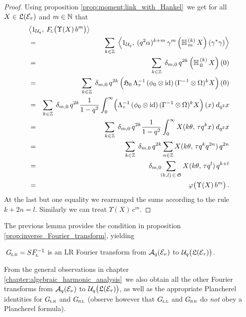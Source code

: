 \begin{proof}
Using proposition \ref{prop:moment:link_with_Hankel}\ we get for
all $X\in \mathfrak{L}(\mathcal E_\tau)$ and $m\in \mathbb{N}$ that
\begin{eqnarray*}
    \lefteqn{ \left\langle 1_{\Uq} ,\: \FLabb
              \!\left(\vertM\Upsilon(X)\, b^m\right)\right\rangle}
\\&=&
    \sum_{k\in\ZZ} \;  \left\langle 1_{\Uq} ,\: (q^2 \alpha)^{k+m}\, \gamma^m
               \left(\YaH{m}{k}\,X\right)(\gamma^*\gamma) \right\rangle
\\&=&
     \sum_{k\in\ZZ} \; \delta_{m,0} \, q^{2k} \left(\YaH{0}{k}\,X\right)(0)
\\&=&
     \sum_{k\in\ZZ} \; \delta_{m,0} \, q^{2k} \left(\holH{0} \, \Lambda_\tau^{-1}\,
         (\evzero \tens \id)\,(\Gamma^{-1} \tens \Omega)^k X \vertL\right)(0)
\\&=&
     \sum_{k\in\ZZ} \; \delta_{m,0} \, q^{2k}  \frac{1}{1-q^2} \int_0^\infty
     \! \left(\Lambda_\tau^{-1}\, (\evzero \tens \id)\,
           (\Gamma^{-1} \tens \Omega)^k X \vertL\right)(x) \: d_{q^2}x
\\&=&
     \sum_{k\in\ZZ} \; \delta_{m,0} \, q^{2k}  \frac{1}{1-q^2} \int_0^\infty
        X(k\theta,\, \tau q^k x) \: d_{q^2}x
\\&=&
     \sum_{k\in\ZZ} \; \delta_{m,0} \, q^{2k}
     \sum_{n\in\ZZ}   X(k\theta,\, \tau q^k q^{2n}) \, q^{2n}
\\&=&
     \delta_{m,0} \!\! \sum_{(k,l)\, \in \,\mathfrak{S}}
          X(k\theta,\, \tau q^l) \, q^{k+l}
\\&=&
\varphi \!\left(\vertM\Upsilon(X)\, b^m\right).
\end{eqnarray*}
At the last but one equality we rearranged the sums according to the rule $k+2n=l$.
Similarly we can treat $\Upsilon(X)\, c^m$.
\end{proof}
\vspace{2ex}



The previous lemma provides the condition in
proposition \ref{prop:inverse_Fourier_transform}, yielding


\begin{prop_sec} \label{prop:Eq2:Fourier:inverse}
$\;G_{\!\scriptscriptstyle LR} = S F_{\!\scriptscriptstyle L}^{-1}$ is an {\scriptsize LR} Fourier transform from
${\mathcal A}_q(\mathcal E_\nu)$ to $\Uq\!\left( \vertM \calL(\Hcore_\tau)\right)$.
\end{prop_sec}


From the general observations in chapter \ref{chapter:algebraic_harmonic_analysis}\
we also obtain all the other Fourier transforms from ${\mathcal A}_q(\mathcal E_\nu)$ to
$\Uq\!\left( \vertM \calL(\Hcore_\tau)\right)$, as well as the appropriate Plancherel
identities for $G_{\!\scriptscriptstyle LR}$ and $G_{\!\scriptscriptstyle RL}$ (observe however that $G_{\!\scriptscriptstyle LL}$ and
$G_{\!\scriptscriptstyle RR}$ do {\em not\/} obey a Plancherel formula).



